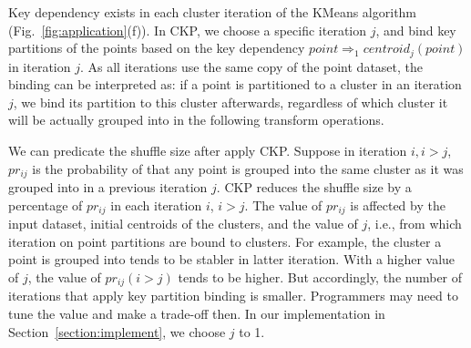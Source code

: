 \documentclass[10pt,journal,compsoc]{IEEEtran}
\newcommand{\red}[1]{\textcolor{red}{#1}}
\begin{document}
Key dependency exists in each cluster iteration of the KMeans algorithm (Fig.~\ref{fig:application}(f)).
In CKP, we choose a specific iteration $j$, and bind key partitions of 
the points based on the key dependency $point \Rightarrow_1 centroid_j(point)$
in iteration $j$.
As all iterations use the same copy of the point dataset,
the binding can be interpreted as: if a point is partitioned to a cluster 
in an iteration $j$, 
we bind its partition to this cluster afterwards,
regardless of which cluster it will be actually grouped into in the following transform operations.

We can predicate the shuffle size after apply CKP.
Suppose in iteration $i, i > j$, 
$pr_{ij}$ is the probability of that any point is grouped 
into the same cluster as it was grouped into in a previous iteration $j$.
CKP reduces the shuffle size by a percentage of $pr_{ij}$ in each iteration $i$, $i>j$. 
The value of $pr_{ij}$ is affected by the input dataset, initial
centroids of the clusters, and the value of $j$, 
i.e., from which iteration on point partitions are bound to clusters.
For example, the cluster a point is grouped into tends to be stabler in latter iteration. With a higher value of $j$, 
the value of $pr_{ij} (i > j)$ tends to be higher.
But accordingly, the number of iterations that apply key partition 
binding is smaller. 
Programmers may need to tune the value and make a trade-off then. 
In our implementation in Section~\ref{section:implement}, we choose $j$ to 1.


\end{document}
